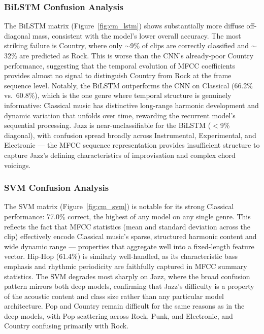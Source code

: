 \documentclass[12pt, a4paper]{article}
\begin{document}
\subsubsection*{BiLSTM Confusion Analysis}

The BiLSTM matrix (Figure~\ref{fig:cm_lstm}) shows substantially more diffuse
off-diagonal mass, consistent with the model's lower overall accuracy. The most striking
failure is Country, where only $\sim$9\% of clips are correctly classified and $\sim$32\%
are predicted as Rock. This is worse than the CNN's already-poor Country performance,
suggesting that the temporal evolution of MFCC coefficients provides almost no signal to
distinguish Country from Rock at the frame sequence level. Notably, the BiLSTM
outperforms the CNN on Classical (66.2\% vs.\ 60.8\%), which is the one genre where
temporal structure is genuinely informative: Classical music has distinctive long-range
harmonic development and dynamic variation that unfolds over time, rewarding the
recurrent model's sequential processing. Jazz is near-unclassifiable for the BiLSTM
($<$9\% diagonal), with confusion spread broadly across Instrumental, Experimental,
and Electronic --- the MFCC sequence representation provides insufficient structure to
capture Jazz's defining characteristics of improvisation and complex chord voicings.

\subsubsection*{SVM Confusion Analysis}

The SVM matrix (Figure~\ref{fig:cm_svm}) is notable for its strong Classical
performance: 77.0\% correct, the highest of any model on any single genre. This
reflects the fact that MFCC statistics (mean and standard deviation across the clip)
effectively encode Classical music's sparse, structured harmonic content and wide
dynamic range --- properties that aggregate well into a fixed-length feature vector.
Hip-Hop (61.4\%) is similarly well-handled, as its characteristic bass emphasis and
rhythmic periodicity are faithfully captured in MFCC summary statistics. The SVM
degrades most sharply on Jazz, where the broad confusion pattern mirrors both deep
models, confirming that Jazz's difficulty is a property of the acoustic content and
class size rather than any particular model architecture. Pop and Country remain
difficult for the same reasons as in the deep models, with Pop scattering across
Rock, Punk, and Electronic, and Country confusing primarily with Rock.
\end{document}
